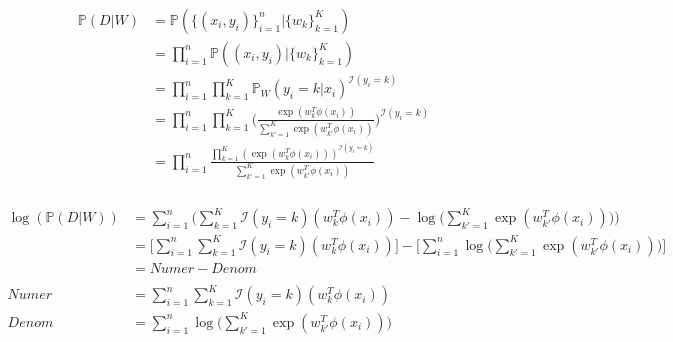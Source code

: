 \documentclass[12pt, fleqn]{article}
\begin{document}
\subsubsection{}
\begin{equation*}
  \begin{aligned}
    \mathbb{P}(D|W) & = \mathbb{P}(\{(x_i, y_i)\}_{i=1}^n | \{w_k\}_{k=1}^K)                                                                                    \\
                    & = \prod_{i=1}^n \mathbb{P}((x_i, y_i) | \{w_k\}_{k=1}^K)                                                                                  \\
                    & = \prod_{i=1}^n \prod_{k=1}^K \mathbb{P}_W (y_i = k | x_i)^{\mathcal{I}(y_i = k)}                                                         \\
                    & = \prod_{i=1}^n \prod_{k=1}^K \bigg( \frac{\exp (w_k^T \phi(x_i))}{\sum_{k'=1}^K \exp (w_{k'}^T \phi(x_i))} \bigg)^{\mathcal{I}(y_i = k)} \\
                    & = \prod_{i=1}^n \frac{\prod_{k=1}^K (\exp (w_k^T \phi(x_i)))^{\mathcal{I}(y_i = k)}}{\sum_{k'=1}^K \exp (w_{k'}^T \phi(x_i))}
  \end{aligned}
\end{equation*}

\subsubsection{}
\begin{equation*}
  \begin{aligned}
    \log (\mathbb{P}(D|W)) & = \sum_{i=1}^n \bigg( \sum_{k=1}^K \mathcal{I}(y_i = k) (w_k^T \phi(x_i)) - \log \bigg( \sum_{k'=1}^K \exp (w_{k'}^T \phi(x_i)) \bigg) \bigg)                            \\
                           & = \bigg[ \sum_{i=1}^n \sum_{k=1}^K \mathcal{I}(y_i = k) (w_k^T \phi(x_i)) \bigg] - \bigg[ \sum_{i=1}^n \log \bigg( \sum_{k'=1}^K \exp (w_{k'}^T \phi(x_i)) \bigg) \bigg] \\
                           & = Numer - Denom                                                                                                                                                          \\
    \\
    Numer                  & = \sum_{i=1}^n \sum_{k=1}^K \mathcal{I}(y_i = k) (w_k^T \phi(x_i))                                                                                                       \\
    Denom                  & = \sum_{i=1}^n \log \bigg( \sum_{k'=1}^K \exp (w_{k'}^T \phi(x_i)) \bigg)
  \end{aligned}
\end{equation*}
\end{document}
